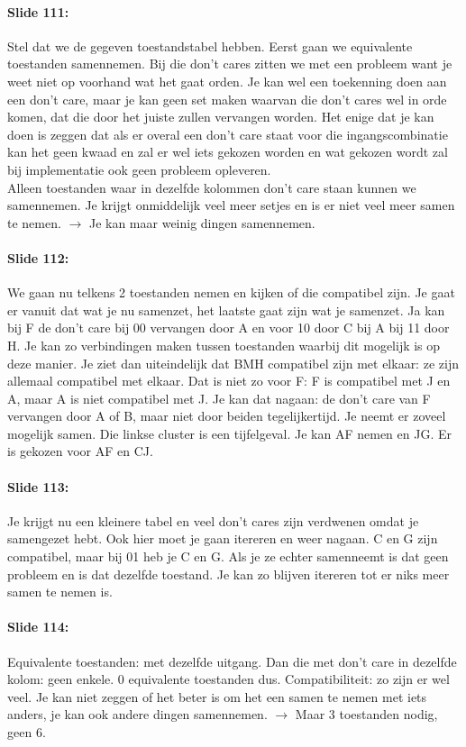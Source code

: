 \documentclass[10pt,a4paper]{book}
\begin{document}
\paragraph{Slide 111:} Stel dat we de gegeven toestandstabel hebben. Eerst gaan we equivalente toestanden samennemen. Bij die don't cares zitten we met een probleem want je weet niet op voorhand wat het gaat orden. Je kan wel een toekenning doen aan een don't care, maar je kan geen set maken waarvan die don't cares wel in orde komen, dat die door het juiste zullen vervangen worden. Het enige dat je kan doen is zeggen dat als er overal een don't care staat voor die ingangscombinatie kan het geen kwaad en zal er wel iets gekozen worden en wat gekozen wordt zal bij implementatie ook geen probleem opleveren.\\
Alleen toestanden waar in dezelfde kolommen don't care staan kunnen we samennemen. Je krijgt onmiddelijk veel meer setjes en is er niet veel meer samen te nemen.  $\rightarrow$ Je kan maar weinig dingen samennemen.

\paragraph{Slide 112:} We gaan nu telkens 2 toestanden nemen en kijken of die compatibel zijn. Je gaat er vanuit dat wat je nu samenzet, het laatste gaat zijn wat je samenzet. Ja kan bij F de don't care bij 00 vervangen door A en voor 10 door C bij A bij 11 door H. Je kan zo verbindingen maken tussen toestanden waarbij dit mogelijk is op deze manier. Je ziet dan uiteindelijk dat BMH compatibel zijn met elkaar: ze zijn allemaal compatibel met elkaar. Dat is niet zo voor F: F is compatibel met J en A, maar A is niet compatibel met J. Je kan dat nagaan: de don't care van F vervangen door A of B, maar niet door beiden tegelijkertijd.
Je neemt er zoveel mogelijk samen. Die linkse cluster is een tijfelgeval. Je kan AF nemen en JG. Er is gekozen voor AF en CJ. 

\paragraph{Slide 113:} Je krijgt nu een kleinere tabel en veel don't cares zijn verdwenen omdat je samengezet hebt. Ook hier moet je gaan itereren en weer nagaan. C en G zijn compatibel, maar bij 01 heb je C en G. Als je ze echter samenneemt is dat geen probleem en is dat dezelfde toestand. Je kan zo blijven itereren tot er niks meer samen te nemen is.

\paragraph{Slide 114:} Equivalente toestanden: met dezelfde uitgang. Dan die met don't care in dezelfde kolom: geen enkele. 0 equivalente toestanden dus. Compatibiliteit: zo zijn er wel veel. Je kan niet zeggen of het beter is om het een samen te nemen met iets anders, je kan ook andere dingen samennemen. $\rightarrow$ Maar 3 toestanden nodig, geen 6.
\end{document}
